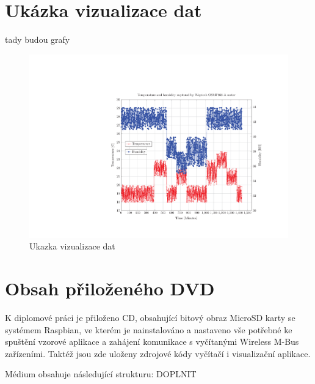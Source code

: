 \chapter{Ukázka vizualizace dat}
\label{PrilohaGrafy}
	\colorbox[rgb]{1,0,0}{tady budou grafy}
	 \begin{figure}[!ht]
  \begin{center}
    \includegraphics[scale=0.8]{obrazky/chart_weptech}
  \end{center}
  \caption{Ukazka vizualizace dat}
	\label{GrafPriloha1}
\end{figure}

\chapter{Obsah přiloženého DVD}
\label{PrilohaMedium}
K diplomové práci je přiloženo CD, obsahující bitový obraz MicroSD karty se systémem Raspbian, ve kterém je nainstalováno a nastaveno vše potřebné ke spuštění vzorové aplikace a zahájení komunikace s vyčítanými Wireless M-Bus zařízeními. Taktéž jsou zde uloženy zdrojové kódy vyčítačí i visualizační aplikace.

Médium obsahuje následující strukturu: \colorbox[rgb]{1,0,0}{DOPLNIT}

